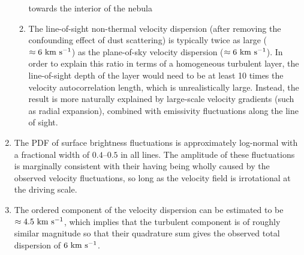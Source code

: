 \documentclass[useAMS,usenatbib]{mn2e}
\begin{document}
\begin{enumerate}
\begin{enumerate}
    towards the interior of the nebula
  \item The line-of-sight non-thermal velocity dispersion (after
    removing the confounding effect of dust scattering) is typically
    twice as large (\(\approx 6~\mathrm{km\ s^{-1}}\)) as the plane-of-sky velocity
    dispersion (\(\approx 6~\mathrm{km\ s^{-1}}\)).  In order to explain this ratio
    in terms of a homogeneous turbulent layer, the line-of-sight depth
    of the layer would need to be at least 10 times the velocity
    autocorrelation length, which is unrealistically large.  Instead,
    the result is more naturally explained by large-scale velocity
    gradients (such as radial expansion), combined with emissivity
    fluctuations along the line of sight.
  \end{enumerate}
\item The PDF of surface brightness fluctuations is approximately
  log-normal with a fractional width of \(0.4\)--\(0.5\) in all lines.
  The amplitude of these fluctuations is marginally consistent with
  their having being wholly caused by the observed velocity
  fluctuations, so long as the velocity field is irrotational at the
  driving scale. 
\item The ordered component of the velocity dispersion can be
  estimated to be \(\approx 4.5~\mathrm{km\ s^{-1}}\), which implies that the
  turbulent component is of roughly similar magnitude so that their
  quadrature sum gives the observed total dispersion of \(6~\mathrm{km\ s^{-1}}\). 
\end{enumerate}
\end{document}
